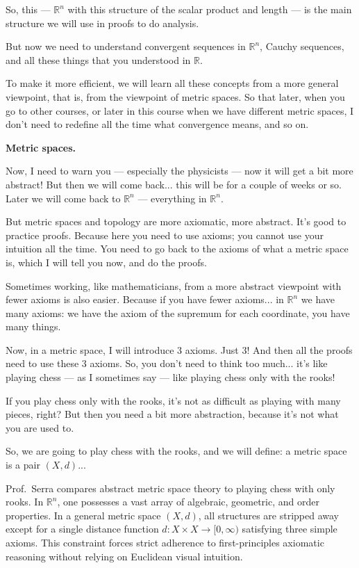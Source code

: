 \begin{spoken-clean}[01:09:24 - 01:12:04]
So, this --- $\mathbb{R}^n$ with this structure of the scalar product and length --- is the main structure we will use in proofs to do analysis.

But now we need to understand convergent sequences in $\mathbb{R}^n$, Cauchy sequences, and all these things that you understood in $\mathbb{R}$.

To make it more efficient, we will learn all these concepts from a more general viewpoint, that is, from the viewpoint of metric spaces. So that later, when you go to other courses, or later in this course when we have different metric spaces, I don't need to redefine all the time what convergence means, and so on.

\textbf{Metric spaces.}

Now, I need to warn you --- especially the physicists --- now it will get a bit more abstract! But then we will come back... this will be for a couple of weeks or so. Later we will come back to $\mathbb{R}^n$ --- everything in $\mathbb{R}^n$.

But metric spaces and topology are more axiomatic, more abstract. It's good to practice proofs. Because here you need to use axioms; you cannot use your intuition all the time. You need to go back to the axioms of what a metric space is, which I will tell you now, and do the proofs.

Sometimes working, like mathematicians, from a more abstract viewpoint with fewer axioms is also easier. Because if you have fewer axioms... in $\mathbb{R}^n$ we have many axioms: we have the axiom of the supremum for each coordinate, you have many things.

Now, in a metric space, I will introduce $3$ axioms. Just $3$! And then all the proofs need to use these $3$ axioms. So, you don't need to think too much... it's like playing chess --- as I sometimes say --- like playing chess only with the rooks!

If you play chess only with the rooks, it's not as difficult as playing with many pieces, right? But then you need a bit more abstraction, because it's not what you are used to.

So, we are going to play chess with the rooks, and we will define: a metric space is a pair $(X, d)$...
\end{spoken-clean}

\begin{didactic-insight}
Prof.\ Serra compares abstract metric space theory to playing chess with only rooks. In $\mathbb{R}^n$, one possesses a vast array of algebraic, geometric, and order properties. In a general metric space $(X, d)$, all structures are stripped away except for a single distance function $d \colon X \times X \to [0, \infty)$ satisfying three simple axioms. This constraint forces strict adherence to first-principles axiomatic reasoning without relying on Euclidean visual intuition.
\end{didactic-insight}

